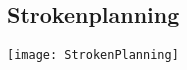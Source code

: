 \begin{appendix}

	\chapter{Strokenplanning}
	\label{appendix:Strokenplanning}
	\begin{graphic}
	 \texttt{[image: StrokenPlanning]}
	\end{graphic}
\end{appendix}
